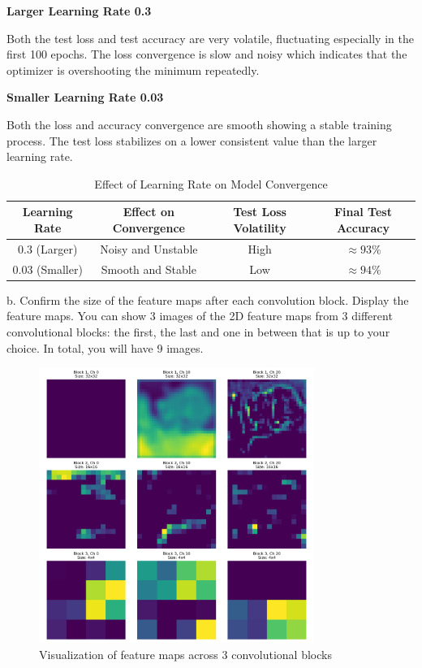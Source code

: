 \textbf{Larger Learning Rate 0.3}

Both the test loss and test accuracy are very volatile, fluctuating especially in the first 100 epochs. The loss convergence is slow and noisy which indicates that the optimizer is overshooting the minimum repeatedly.

\textbf{Smaller Learning Rate 0.03}

Both the loss and accuracy convergence are smooth showing a stable training process. The test loss stabilizes on a lower consistent value than the larger learning rate.

\begin{table}[h]
    \centering
    \caption{Effect of Learning Rate on Model Convergence}
    \begin{tabular}{|c|c|c|c|}
        \hline
        \textbf{Learning Rate} & \textbf{Effect on Convergence} & \textbf{Test Loss Volatility} & \textbf{Final Test Accuracy} \\
        \hline
        $0.3$ (Larger) & Noisy and Unstable & High & $\approx 93\%$ \\
        \hline
        $0.03$ (Smaller) &  Smooth and Stable & Low & $\approx 94\%$ \\
        \hline
    \end{tabular}
\end{table}

b. Confirm the size of the feature maps after each convolution block. Display the feature maps. You can show 3 images of the 2D feature maps from 3 different convolutional blocks: the first, the last and one in between that is up to your choice. In total, you will have 9 images.

\begin{figure}[H] 
    \centering
    \includegraphics[width=0.8\textwidth]{assignment_1/report/images/feature_maps_visualization.png} 
    \caption{Visualization of  feature maps across 3 convolutional blocks}
    \label{figure_1}
\end{figure}